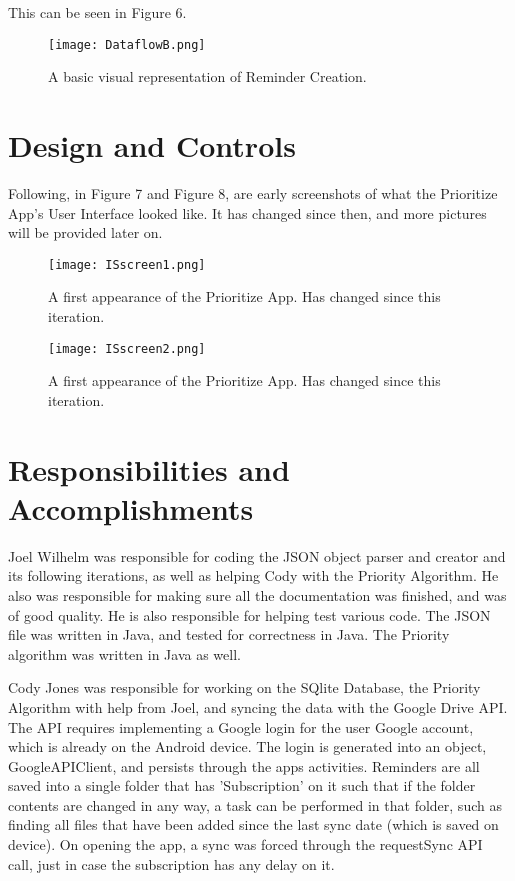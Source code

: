 \documentclass[12pt]{article}
\begin{document}
This can be seen in Figure 6.

\begin{figure}[h]
\texttt{[image: DataflowB.png]}
\centering
\caption{A basic visual representation of Reminder Creation.}
\end{figure}


\section{Design and Controls}

Following, in Figure 7 and Figure 8, are early screenshots of what the Prioritize App's User Interface looked like. It has changed since then, and more pictures will be provided later on.

\begin{figure}[h]
\texttt{[image: ISscreen1.png]}
\centering
\caption{A first appearance of the Prioritize App. Has changed since this iteration.}
\end{figure}


\begin{figure}[h]
\texttt{[image: ISscreen2.png]}
\centering
\caption{A first appearance of the Prioritize App. Has changed since this iteration.}
\end{figure}

\section{Responsibilities and Accomplishments}
Joel Wilhelm was responsible for coding the JSON object parser and creator and its following iterations, as well as helping Cody with the Priority Algorithm. He also was responsible for making sure all the documentation was finished, and was of good quality. He is also responsible for helping test various code. The JSON file was written in Java, and tested for correctness in Java. The Priority algorithm was written in Java as well.

Cody Jones was responsible for working on the SQlite Database, the Priority Algorithm with help from Joel, and syncing the data with the Google Drive API. The API requires implementing a Google login for the user Google account, which is already on the Android device. The login is generated into an object, GoogleAPIClient, and persists through the apps activities. Reminders are all saved into a single folder that has 'Subscription' on it such that if the folder contents are changed in any way, a task can be performed in that folder, such as finding all files that have been added since the last sync date (which is saved on device). On opening the app, a sync was forced through the requestSync API call, just in case the subscription has any delay on it.
\end{document}
